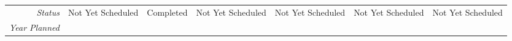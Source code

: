 \begin{tabularx}{\textwidth}{r|X|X|X|X|X|X|}
    \multicolumn{1}{|r|}{\cellcolor{ccorangelight}\textit{Status}}                & Not Yet Scheduled                                                         & Completed                                                         & Not Yet Scheduled                                                         & Not Yet Scheduled                                                         & Not Yet Scheduled                                                         & Not Yet Scheduled                                                         \\
    \multicolumn{1}{|r|}{\cellcolor{ccorangelight}\textit{Year Planned}}                  &                                                      &                                                      &                                                      &                                                      &                                                      &                                                      \\ \hline
\end{tabularx}